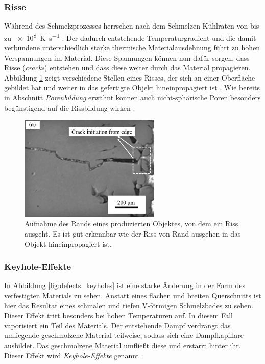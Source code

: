 		\subsubsection{Risse}
		Während des Schmelzprozesses herrschen nach dem Schmelzen Kühlraten von bis zu
		\SI{e8}{\kelvin\per\second} \cite{zhang2017defect}. Der dadurch entstehende
		Temperaturgradient und die damit verbundene unterschiedlich starke thermische
		Materialausdehnung führt zu hohen Verspannungen im Material. Diese Spannungen können nun
		dafür sorgen, dass Risse (\emph{cracks}) entstehen und dass diese weiter durch das
		Material propagieren. Abbildung \ref{fig:defects_cracks} zeigt verschiedene Stellen eines
		Risses, der sich an einer Oberfläche gebildet hat und weiter in das gefertigte Objekt
		hineinpropagiert ist \cite{zhang2017defect}. Wie bereits in Abschnitt \emph{Porenbildung}
		erwähnt können auch nicht-sphärische Poren besonders begünstigend auf die Rissbildung wirken
		\cite{galy2018main}.

		\begin{figure}[!ht]
			\centering
			\includegraphics[width=0.6\textwidth]{chapter/main/theory/img/defects/cracks_part.png}
			\caption{Aufnahme des Rands eines produzierten Objektes, von dem ein Riss ausgeht. Es
			ist gut erkennbar wie der Riss von Rand ausgehen in das Objekt hineinpropagiert ist.
			\cite{zhang2017defect}}
			\label{fig:defects_cracks}
		\end{figure}

		\subsubsection{Keyhole-Effekte}
		In Abbildung \ref{fig:defects_keyholes} ist eine starke Änderung in der Form des
		verfestigten Materials zu sehen. Anstatt eines flachen und breiten Querschnitts ist hier
		das Resultat eines schmalen und tiefen V-förmigen Schmelzbades zu sehen. Dieser Effekt
		tritt besonders bei hohen Temperaturen auf. In diesem Fall vaporisiert ein Teil des
		Materials. Der entstehende Dampf verdrängt das umliegende geschmolzene Material teilweise,
		sodass sich eine Dampfkapillare ausbildet. Das geschmolzene Material umfließt diese und
		erstarrt hinter ihr. Dieser Effekt wird \emph{Keyhole-Effekte} genannt
		\cite{eskandarisabzi2019defect}.

